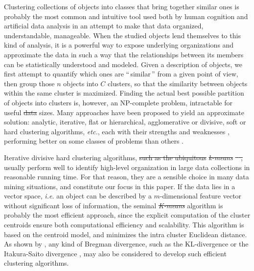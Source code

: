 \documentclass[natbib,smallextended]{svjour3}
\providecommand{\DIFaddtex}[1]{{\protect\color{blue}\uwave{#1}}} %
\providecommand{\DIFdeltex}[1]{{\protect\color{red}\sout{#1}}}                      %
\providecommand{\DIFaddbegin}{} %
\providecommand{\DIFaddend}{} %
\providecommand{\DIFdelbegin}{} %
\providecommand{\DIFdelend}{} %
\providecommand{\DIFadd}[1]{\texorpdfstring{\DIFaddtex{#1}}{#1}} %
\providecommand{\DIFdel}[1]{\texorpdfstring{\DIFdeltex{#1}}{}} %
\newcommand{\DIFscaledelfig}{0.5}
\newlength{\DIFdelgraphicswidth} %
\newlength{\DIFdelgraphicsheight} %
\newcommand{\DIFaddincludegraphics}[2][]{{\color{blue}\fbox{\DIFOincludegraphics[#1]{#2}}}} %
\newcommand{\DIFdelincludegraphics}[2][]{%
\sbox{\DIFdelgraphicsbox}{\DIFOincludegraphics[#1]{#2}}%
\settoboxwidth{\DIFdelgraphicswidth}{\DIFdelgraphicsbox} %
\settoboxtotalheight{\DIFdelgraphicsheight}{\DIFdelgraphicsbox} %
\scalebox{\DIFscaledelfig}{%
\parbox[b]{\DIFdelgraphicswidth}{\usebox{\DIFdelgraphicsbox}\\[-\baselineskip] \rule{\DIFdelgraphicswidth}{0em}}\llap{\resizebox{\DIFdelgraphicswidth}{\DIFdelgraphicsheight}{%
\setlength{\unitlength}{\DIFdelgraphicswidth}%
\begin{picture}(1,1)%
\thicklines\linethickness{2pt} %
{\color[rgb]{1,0,0}\put(0,0){\framebox(1,1){}}}%
{\color[rgb]{1,0,0}\put(0,0){\line( 1,1){1}}}%
{\color[rgb]{1,0,0}\put(0,1){\line(1,-1){1}}}%
\end{picture}%
}\hspace*{3pt}}} %
} %
\DeclareRobustCommand{\DIFaddbegin}{\DIFOaddbegin \let\includegraphics\DIFaddincludegraphics} %
\DeclareRobustCommand{\DIFaddend}{\DIFOaddend \let\includegraphics\DIFOincludegraphics} %
\DeclareRobustCommand{\DIFdelbegin}{\DIFOdelbegin \let\includegraphics\DIFdelincludegraphics} %
\DeclareRobustCommand{\DIFdelend}{\DIFOaddend \let\includegraphics\DIFOincludegraphics} %
\begin{document}
Clustering collections of objects into classes that bring together similar ones is probably the most common and intuitive tool used both by human cognition and artificial data analysis in an attempt to make that data organized, understandable, manageable. When the studied objects lend themselves to this kind of analysis, it is a powerful way to expose underlying organizations and approximate the data in such a way that the relationships between its members can be statistically understood and modeled. Given a description of objects, we first attempt to quantify which ones are ``\,similar\,'' from a given point of view, then group those $n$ objects into $C$ clusters, so that the similarity between objects within the same cluster is maximized. Finding the actual best possible partition of objects into clusters is, however, an NP-complete problem, intractable for useful \DIFdelbegin \DIFdel{data }\DIFdelend \DIFaddbegin \DIFadd{datasets }\DIFaddend sizes. Many approaches have been proposed to yield an approximate solution: analytic, iterative, flat or hierarchical, agglomerative or divisive, soft or hard clustering algorithms, \textit{etc.}, each with their strengths and weaknesses \citep{jain2010data}, performing better on some classes of problems than others \citep{steinbach2000comparison,thalamuthu2006evaluation}.

Iterative divisive hard clustering algorithms, \DIFdelbegin \DIFdel{such as the ubiquitous }\emph{\DIFdel{k-means}} %
\DIFdel{\mbox{%
\citep{macQueenBsmsp67}}%
, }\DIFdelend usually perform well to identify high-level organization in large data collections in reasonable running time. For that reason, they are a sensible choice in many data mining situations, and constitute our focus in this paper.
If the data lies in a vector space, \textit{i.e.} an object can be described by a $m$-dimensional feature vector without significant loss of information, the seminal \emph{\DIFdelbegin \DIFdel{K-means}\DIFdelend \DIFaddbegin \DIFadd{k-means}\DIFaddend } algorithm \citep{macQueenBsmsp67} is probably the most efficient approach, since the explicit computation of the cluster centroids ensure both computational efficiency and scalability. This algorithm is  based on the centroid model, and minimizes the intra cluster Euclidean distance. As shown by \citet{Banerjee:2005:CBD:1046920.1194902}, any kind of Bregman divergence, such as the KL-divergence \citep{Dhillon:2003:DIT:944919.944973} or the Itakura-Saito divergence \citep{linde:algorithm}, may also be considered to develop such efficient clustering algorithms.
\end{document}
